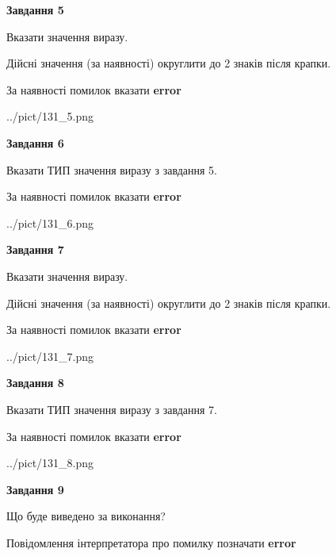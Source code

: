 \documentclass[11pt, ukrainian]{article}
\begin{document}
{\begin {large}
{\begin {center}\textbf{Завдання 5}\end {center}}\par
Вказати значення виразу. \par
Дійсні значення (за наявності) округлити до 2 знаків після крапки. \par
За наявності помилок вказати \textbf{error}

\begin{center}
	{../pict/131_5.png}
\end{center}
\newpage

{\begin {center}\textbf{Завдання 6}\end {center}}\par
Вказати ТИП значення виразу з завдання 5. \par
За наявності помилок вказати \textbf{error}

\begin{center}
	{../pict/131_6.png}
\end{center}
\newpage

{\begin {center}\textbf{Завдання 7}\end {center}}\par
Вказати значення виразу. \par
Дійсні значення (за наявності) округлити до 2 знаків після крапки. \par
За наявності помилок вказати \textbf{error}

\begin{center}
	{../pict/131_7.png}
\end{center}
\newpage

{\begin {center}\textbf{Завдання 8}\end {center}}\par
Вказати ТИП значення виразу з завдання 7. \par
За наявності помилок вказати \textbf{error}

\begin{center}
	{../pict/131_8.png}
\end{center}
\newpage

{\begin {center}\textbf{Завдання 9}\end {center}}\par
Що буде виведено за виконання? \par
Повідомлення інтерпретатора про помилку позначати \textbf{error}


\end{large}}
\end{document}
